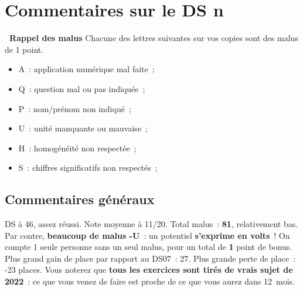 \documentclass[a4paper, 12pt, final, garamond]{book}
\begin{document}
\setcounter{chapter}{7}

\chapter{Commentaires sur le DS n}

\begin{NCprop}[width=\linewidth]{\centering\bfseries\ Rappel des malus}
    Chacune des lettres suivantes sur vos copies sont des malus de \num{1}
    point.\smallbreak
    \begin{minipage}{0.50\linewidth}
        \begin{itemize}
            \item A~: application numérique mal faite~;
            \item Q~: question mal ou pas indiquée~;
            \item P~: nom/prénom non indiqué~;
        \end{itemize}
    \end{minipage}
    \begin{minipage}{0.50\linewidth}
        \begin{itemize}
            \item U~: unité manquante ou mauvaise~;
            \item H~: homogénéité non respectée~;
            \item S~: chiffres significatifs non respectés~;
        \end{itemize}
    \end{minipage}
\end{NCprop}

\section{Commentaires généraux}

DS à 46, assez réussi. Note moyenne à 11/20. Total malus~: \textbf{81},
relativement bas. Par contre, \textbf{beaucoup de malus -U}~: un potentiel
\textbf{s'exprime en volts}~! On compte 1 seule personne sans un seul malus,
pour un total de \textbf{1} point de bonus. Plus grand gain de place par rapport
au DS07~: 27. Plus grande perte de place~: -23 places. Vous noterez que
\textbf{tous les exercices sont tirés de vrais sujet de 2022}~: ce que vous
venez de faire est proche de ce que vous aurez dans \SI{12}{mois}.
\end{document}
